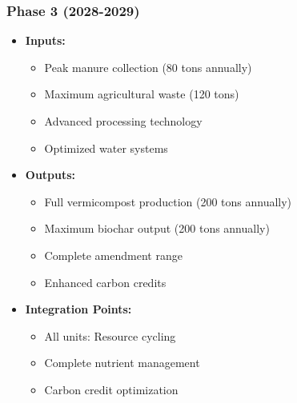 \subsubsection{Phase 3 (2028-2029)}
\begin{itemize}
    \item \textbf{Inputs:}
    \begin{itemize}
        \item Peak manure collection (80 tons annually)
        \item Maximum agricultural waste (120 tons)
        \item Advanced processing technology
        \item Optimized water systems
    \end{itemize}
    \item \textbf{Outputs:}
    \begin{itemize}
        \item Full vermicompost production (200 tons annually)
        \item Maximum biochar output (200 tons annually)
        \item Complete amendment range
        \item Enhanced carbon credits
    \end{itemize}
    \item \textbf{Integration Points:}
    \begin{itemize}
        \item All units: Resource cycling
        \item Complete nutrient management
        \item Carbon credit optimization
    \end{itemize}
\end{itemize}

